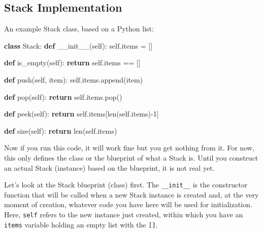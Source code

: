 \documentclass[
  letterpaper,
]{scrbook}
\newenvironment{Shaded}{\begin{snugshade}}{\end{snugshade}}
\newcommand{\BuiltInTok}[1]{\textcolor[rgb]{0.00,0.23,0.31}{#1}}
\newcommand{\ControlFlowTok}[1]{\textcolor[rgb]{0.00,0.23,0.31}{\textbf{#1}}}
\newcommand{\DecValTok}[1]{\textcolor[rgb]{0.68,0.00,0.00}{#1}}
\newcommand{\FunctionTok}[1]{\textcolor[rgb]{0.28,0.35,0.67}{#1}}
\newcommand{\KeywordTok}[1]{\textcolor[rgb]{0.00,0.23,0.31}{\textbf{#1}}}
\newcommand{\NormalTok}[1]{\textcolor[rgb]{0.00,0.23,0.31}{#1}}
\newcommand{\OperatorTok}[1]{\textcolor[rgb]{0.37,0.37,0.37}{#1}}
\newcommand{\VariableTok}[1]{\textcolor[rgb]{0.07,0.07,0.07}{#1}}
\begin{document}
\subsection*{Stack Implementation}\label{stack-implementation}

An example Stack class, based on a Python list:

\begin{Shaded}
\begin{Highlighting}[]
\KeywordTok{class}\NormalTok{ Stack: }
    \KeywordTok{def} \FunctionTok{\_\_init\_\_}\NormalTok{(}\VariableTok{self}\NormalTok{):}
        \VariableTok{self}\NormalTok{.items }\OperatorTok{=}\NormalTok{ []}
    
    \KeywordTok{def}\NormalTok{ is\_empty(}\VariableTok{self}\NormalTok{):}
        \ControlFlowTok{return} \VariableTok{self}\NormalTok{.items }\OperatorTok{==}\NormalTok{ []}
    
    \KeywordTok{def}\NormalTok{ push(}\VariableTok{self}\NormalTok{, item):}
        \VariableTok{self}\NormalTok{.items.append(item)}
        
    \KeywordTok{def}\NormalTok{ pop(}\VariableTok{self}\NormalTok{):}
        \ControlFlowTok{return} \VariableTok{self}\NormalTok{.items.pop()}
    
    \KeywordTok{def}\NormalTok{ peek(}\VariableTok{self}\NormalTok{):}
        \ControlFlowTok{return} \VariableTok{self}\NormalTok{.items[}\BuiltInTok{len}\NormalTok{(}\VariableTok{self}\NormalTok{.items)}\OperatorTok{{-}}\DecValTok{1}\NormalTok{]}
    
    \KeywordTok{def}\NormalTok{ size(}\VariableTok{self}\NormalTok{):}
        \ControlFlowTok{return} \BuiltInTok{len}\NormalTok{(}\VariableTok{self}\NormalTok{.items)}
\end{Highlighting}
\end{Shaded}

Now if you run this code, it will work fine but you get nothing from it.
For now, this only defines the class or the blueprint of what a Stack
is. Until you construct an actual Stack (instance) based on the
blueprint, it is not real yet.

Let's look at the Stack blueprint (class) first. The
\texttt{\_\_init\_\_} is the constructor function that will be called
when a new Stack instance is created and, at the very moment of
creation, whatever code you have here will be used for initialization.
Here, \texttt{self} refers to the new instance just created, within
which you have an \texttt{items} variable holding an empty list with the
\texttt{{[}{]}}.
\end{document}
